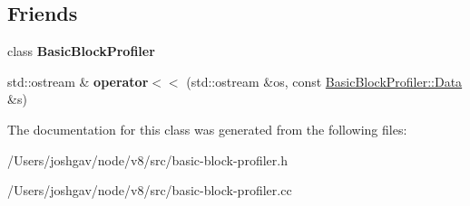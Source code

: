 \subsection*{Friends}
\begin{DoxyCompactItemize}
\item 
class {\bfseries Basic\+Block\+Profiler}\hypertarget{classv8_1_1internal_1_1_basic_block_profiler_1_1_data_a05ed5b31a23bf57caa59bca8951c3ba9}{}\label{classv8_1_1internal_1_1_basic_block_profiler_1_1_data_a05ed5b31a23bf57caa59bca8951c3ba9}

\item 
std\+::ostream \& {\bfseries operator$<$$<$} (std\+::ostream \&os, const \hyperlink{classv8_1_1internal_1_1_basic_block_profiler_1_1_data}{Basic\+Block\+Profiler\+::\+Data} \&s)\hypertarget{classv8_1_1internal_1_1_basic_block_profiler_1_1_data_a94126580a7f5d55b9013bdd1a6c93016}{}\label{classv8_1_1internal_1_1_basic_block_profiler_1_1_data_a94126580a7f5d55b9013bdd1a6c93016}

\end{DoxyCompactItemize}


The documentation for this class was generated from the following files\+:\begin{DoxyCompactItemize}
\item 
/\+Users/joshgav/node/v8/src/basic-\/block-\/profiler.\+h\item 
/\+Users/joshgav/node/v8/src/basic-\/block-\/profiler.\+cc\end{DoxyCompactItemize}
